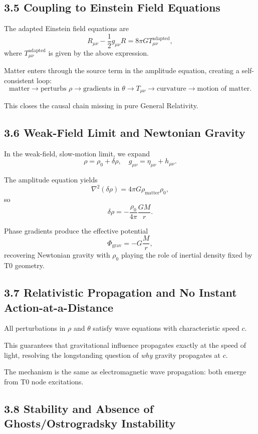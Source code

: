\documentclass[12pt,a4paper]{article}
\begin{document}
	\subsection{3.5 Coupling to Einstein Field Equations}
	
	The adapted Einstein field equations are
	\[
	R_{\mu\nu} - \frac{1}{2} g_{\mu\nu} R = 8\pi G T_{\mu\nu}^{\text{adapted}},
	\]
	where $T_{\mu\nu}^{\text{adapted}}$ is given by the above expression.
	
	Matter enters through the source term in the amplitude equation, creating a self-consistent loop:
	\[
	\text{matter} \to \text{perturbs } \rho \to \text{gradients in } \theta \to T_{\mu\nu} \to \text{curvature} \to \text{motion of matter}.
	\]
	
	This closes the causal chain missing in pure General Relativity.
	
	\subsection{3.6 Weak-Field Limit and Newtonian Gravity}
	
	In the weak-field, slow-motion limit, we expand
	\[
	\rho = \rho_0 + \delta \rho, \quad g_{\mu\nu} = \eta_{\mu\nu} + h_{\mu\nu}.
	\]
	
	The amplitude equation yields
	\[
	\nabla^2 (\delta \rho) = 4\pi G \rho_{\text{matter}} \rho_0,
	\]
	so
	\[
	\delta \rho = -\frac{\rho_0}{4\pi} \frac{GM}{r}.
	\]
	
	Phase gradients produce the effective potential
	\[
	\Phi_{\text{grav}} = -G \frac{M}{r},
	\]
	recovering Newtonian gravity with $\rho_0$ playing the role of inertial density fixed by T0 geometry.
	
	\subsection{3.7 Relativistic Propagation and No Instant Action-at-a-Distance}
	
	All perturbations in $\rho$ and $\theta$ satisfy wave equations with characteristic speed $c$.
	
	This guarantees that gravitational influence propagates exactly at the speed of light, resolving the longstanding question of \textit{why} gravity propagates at $c$.
	
	The mechanism is the same as electromagnetic wave propagation: both emerge from T0 node excitations.
	
	\subsection{3.8 Stability and Absence of Ghosts/Ostrogradsky Instability}
	
\end{document}
